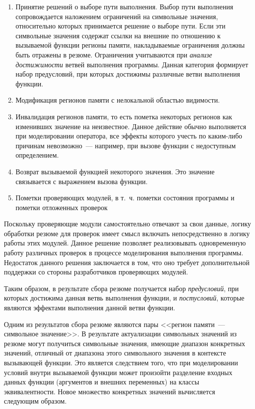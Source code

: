 \begin{enumerate}
 \item Принятие решений о выборе пути выполнения. Выбор пути выполнения сопровождается наложением ограничений на символьные значения, относительно которых принимается решение о выборе пути. Если эти символьные значения содержат ссылки на внешние по отношению к вызываемой функции регионы памяти, накладываемые ограничения должны быть отражены в резюме. Ограничения учитываются при \textit{анализе достижимости} ветвей выполнения программы. Данная категория формирует набор предусловий, при которых достижимы различные ветви выполнения функции.
 
 \item Модификация регионов памяти с нелокальной областью видимости.
 
 \item Инвалидация регионов памяти, то есть пометка некоторых регионов как изменивших значение на неизвестное. Данное действие обычно выполняется при моделировании оператора, все эффекты которого учесть по каким-либо причинам невозможно~--- например, при вызове функции с недоступным определением.
 
 \item Возврат вызываемой функцией некоторого значения. Это значение связывается с выражением вызова функции.
 
 \item Пометки проверяющих модулей, в т.~ч. пометки состояния программы и пометки отложенных проверок
 
\end{enumerate}

Поскольку проверяющие модули самостоятельно отвечают за свои данные, логику обработки резюме для проверок имеет смысл включать непосредственно в логику работы этих модулей. Данное решение позволяет реализовывать одновременную работу различных проверок в процессе моделирования выполнения программы. Недостаток данного решения заключается в том, что оно требует дополнительной поддержки со стороны разработчиков проверяющих модулей.

Таким образом, в результате сбора резюме получается набор \textit{предусловий}, при которых достижима данная ветвь выполнения функции, и \textit{постусловий}, которые являются эффектами выполнения данной ветви функции.

Одним из результатов сбора резюме являются пары <<регион памяти~--- символьное значение>>. В результате актуализации символьных значений из резюме могут получиться символьные значения, имеющие диапазон конкретных значений, отличный от диапазона этого символьного значения в контексте вызывающей функции. Это является следствием того, что при моделировании условий внутри вызываемой функции может произойти разделение входных данных функции (аргументов и внешних переменных) на классы эквивалентности. Новое множество конкретных значений вычисляется следующим образом.

